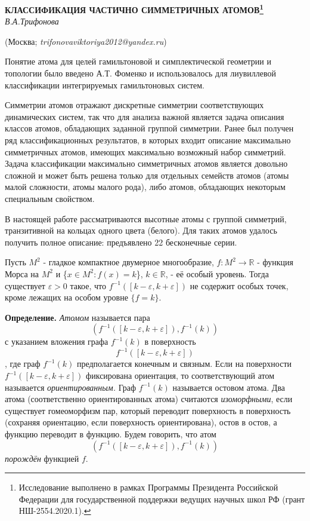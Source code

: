 \begin{center}
    {\bf КЛАССИФИКАЦИЯ ЧАСТИЧНО СИММЕТРИЧНЫХ АТОМОВ\footnote{Исследование выполнено в рамках Программы Президента Российской Федерации для государственной поддержки ведущих научных школ РФ (грант НШ-2554.2020.1).}}\\

    {\it В.А.Трифонова}

    (Москва; {\it trifonovaviktoriya2012@yandex.ru})
\end{center}


Понятие атома для целей гамильтоновой и симплектической геометрии и топологии было введено А.Т. Фоменко и использовалось для лиувиллевой классификации интегрируемых гамильтоновых систем.


Симметрии атомов отражают дискретные симметрии соответствующих динамических систем, так что для анализа важной является задача описания классов атомов, обладающих заданной группой симметрии. Ранее был получен ряд классификационных результатов, в которых входит описание максимально симметричных атомов, имеющих максимально возможный набор симметрий. Задача классификации максимально симметричных атомов является довольно сложной и может быть решена только для отдельных семейств атомов (атомы малой сложности, атомы малого рода), либо атомов, обладающих некоторым специальным свойством.

В настоящей работе рассматриваются высотные атомы с группой симметрий, транзитивной на кольцах одного цвета (белого). Для таких атомов удалось получить полное описание: предъявлено 22 бесконечные серии.




Пусть $M^2$ - гладкое компактное двумерное многообразие, $f:M^2 \to \mathbb{R}$ - функция Морса	на $M^2$ и \{$x\in M^2 \colon f(x)=k $\}, $k \in \mathbb{R}$, - её особый уровень. Тогда существует ${\varepsilon > 0}$ такое, что ${f^{-1}([k-\varepsilon, k+\varepsilon ])}$ не содержит особых точек, кроме лежащих на особом уровне $\{f=k\}$.



		{\bf Определение.}
		{\em Атомом} называется пара
		$${(f^{-1}([k-\varepsilon, k+\varepsilon ]), f^{-1}(k))}$$
		с указанием вложения графа ${f^{-1}(k)}$ в поверхность
		$${f^{-1}([k-\varepsilon, k+\varepsilon ])}$$,
		где граф ${f^{-1}(k)}$ предполагается конечным и связным. Если на поверхности ${f^{-1}([k-\varepsilon, k+\varepsilon ])}$ фиксирована ориентация, то соответствующий атом называется {\em ориентированным.} Граф ${f^{-1}(k)}$ называется остовом атома. Два атома (соответственно ориентированных атома) считаются {\em изоморфными}, если существует гомеоморфизм пар, который переводит поверхность в поверхность (сохраняя ориентацию, если поверхность ориентирована), остов в остов, а функцию переводит в функцию. Будем говорить, что атом
		$${(f^{-1}([k-\varepsilon, k+\varepsilon ]),f^{-1}(k))}$$
		{\em порождён} функцией $f$.




